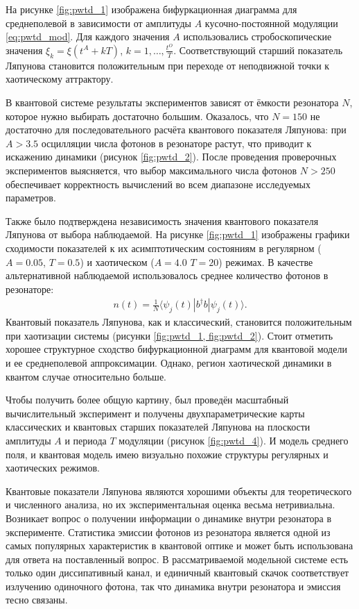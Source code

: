 На рисунке \cref{fig:pwtd_1} изображена бифуркационная диаграмма для среднеполевой в зависимости от амплитуды $A$ кусочно-постоянной модуляции \cref{eq:pwtd_mod}. Для каждого значения $A$ использовались стробоскопические значения $\xi_k = \xi(t^A + k T)$, $k=1,\ldots,\frac{t^O}{T}$. Соответствующий старший показатель Ляпунова становится положительным при переходе от неподвижной точки к хаотическому аттрактору.

В квантовой системе результаты экспериментов зависят от ёмкости резонатора $N$, которое нужно выбирать достаточно большим.
Оказалось, что $N = 150$ не достаточно для последовательного расчёта квантового показателя Ляпунова: при $A>3.5$ осцилляции числа фотонов в резонаторе растут, что приводит к искажению динамики (рисунок \cref{fig:pwtd_2}). 
После проведения проверочных экспериментов выясняется, что выбор максимального числа фотонов $N>250$ обеспечивает корректность вычислений во всем диапазоне исследуемых параметров.

Также было подтверждена независимость значения квантового показателя Ляпунова от выбора наблюдаемой.
На рисунке \cref{fig:pwtd_1} изображены графики сходимости показателей к их асимптотическим состояниям в регулярном ($A = 0.05$, $T = 0.5$) и хаотическом ($A = 4.0$ $T = 20$) режимах. В качестве альтернативной наблюдаемой использовалось среднее количество фотонов в резонаторе:
\begin{equation}
	\label{eq:pwtd_num_ph}
	\begin{gathered}
		n(t) = \frac{1}{N} \langle \psi_j(t)| b^{\dagger} b | \psi_j(t) \rangle.
	\end{gathered}
\end{equation}
Квантовый показатель Ляпунова, как и классический, становится положительным при хаотизации системы (рисунки \cref{fig:pwtd_1, fig:pwtd_2}). 
Стоит отметить хорошее структурное сходство бифуркационной диаграмм для квантовой модели и ее среднеполевой аппроксимации. Однако, регион хаотической динамики в квантом случае относительно больше.

Чтобы получить более общую картину, был проведён масштабный вычислительный эксперимент и получены двухпараметрические карты  классических и квантовых старших показателей Ляпунова на плоскости амплитуды $A$ и периода $T$ модуляции (рисунок \cref{fig:pwtd_4}). 
И модель среднего поля, и квантовая модель имею визуально похожие структуры регулярных и хаотических режимов.

Квантовые показатели Ляпунова являются хорошими объекты для теоретического и численного анализа, но их экспериментальная оценка весьма нетривиальна.
Возникает вопрос о получении информации о динамике внутри резонатора в эксперименте.
Статистика эмиссии фотонов из резонатора является одной из самых популярных характеристик в квантовой оптике \cite{Delteil2014, Brange2019} и может быть использована для ответа на поставленный вопрос. 
В рассматриваемой модельной системе есть только один диссипативный канал, и единичный квантовый скачок соответствует излучению одиночного фотона, так что динамика внутри резонатора и эмиссия тесно связаны. 

